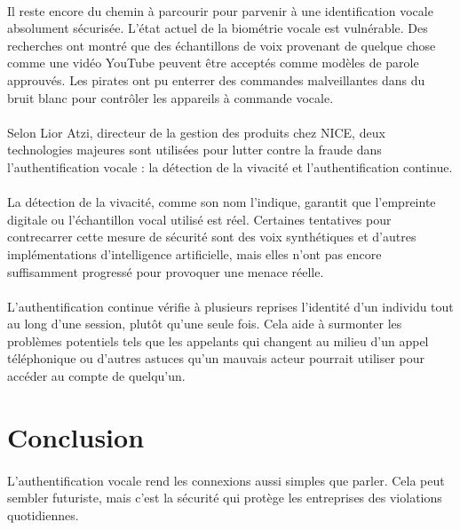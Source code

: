 \paragraph{}Il reste encore du chemin à parcourir pour parvenir à une identification vocale absolument sécurisée. L'état actuel de la biométrie vocale est vulnérable. Des recherches ont montré que des échantillons de voix provenant de quelque chose comme une vidéo YouTube peuvent être acceptés comme modèles de parole approuvés. Les pirates ont pu enterrer des commandes malveillantes dans du bruit blanc pour contrôler les appareils à commande vocale.
\paragraph{}Selon Lior Atzi, directeur de la gestion des produits chez NICE, deux technologies majeures sont utilisées pour lutter contre la fraude dans l'authentification vocale : la détection de la vivacité et l'authentification continue. 
\paragraph{}La détection de la vivacité, comme son nom l'indique, garantit que l'empreinte digitale ou l'échantillon vocal utilisé est réel. Certaines tentatives pour contrecarrer cette mesure de sécurité sont des voix synthétiques et d'autres implémentations d'intelligence artificielle, mais elles n'ont pas encore suffisamment progressé pour provoquer une menace réelle.
\paragraph{}L'authentification continue vérifie à plusieurs reprises l'identité d'un individu tout au long d'une session, plutôt qu'une seule fois. Cela aide à surmonter les problèmes potentiels tels que les appelants qui changent au milieu d'un appel téléphonique ou d'autres astuces qu'un mauvais acteur pourrait utiliser pour accéder au compte de quelqu'un.


 


\newpage 
{}
\section*{Conclusion}
\paragraph{}L'authentification vocale rend les connexions aussi simples que parler. Cela peut sembler futuriste, mais c'est la sécurité qui protège les entreprises des violations quotidiennes.
